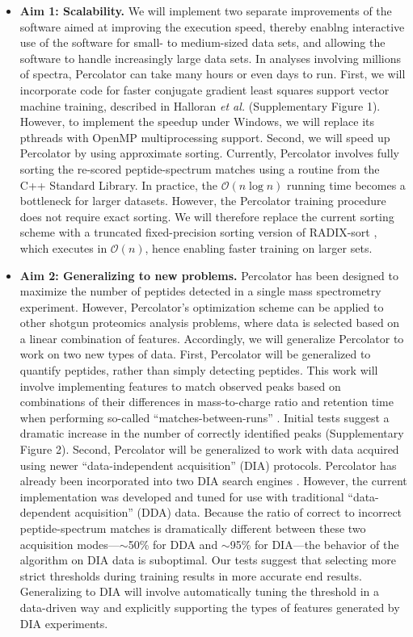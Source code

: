 \documentclass{article}
\begin{document}
\begin{itemize}

\item {\bf Aim 1: Scalability.}  We will implement two separate improvements of the software aimed at improving the execution speed, thereby enablng interactive use of the software for small- to medium-sized data sets, and allowing the software to handle increasingly large data sets. In analyses involving millions of spectra, Percolator can take many hours or even days to run.
First, we will incorporate code for faster conjugate gradient least squares support vector machine training, described in Halloran {\em et al.} \cite{halloran:matter} (Supplementary Figure 1). However, to implement the speedup under Windows, we will replace its pthreads with OpenMP multiprocessing support.  Second, we will speed up Percolator by using approximate sorting. Currently, Percolator involves fully sorting the re-scored peptide-spectrum matches using a routine from the C++ Standard Library. In practice, the $\mathcal{O}(n \log n)$ running time becomes a bottleneck for larger datasets. However, the Percolator training procedure does not require exact sorting. We will therefore replace the current sorting scheme with a truncated fixed-precision sorting version of RADIX-sort \cite{cormen:introduction}, which executes in $\mathcal{O}(n)$, hence enabling faster training on larger sets.

\item {\bf Aim 2: Generalizing to new problems.} Percolator has been designed to maximize the number of peptides detected in a single mass spectrometry experiment. However, Percolator's optimization scheme can be applied to other shotgun proteomics analysis problems, where data is selected based on a linear combination of features. Accordingly, we will generalize Percolator to work on two new types of data.  First, Percolator will be generalized to quantify peptides, rather than simply detecting peptides. This work will involve implementing features to match observed peaks based on combinations of their differences in mass-to-charge ratio and retention time when performing so-called ``matches-between-runs''  \cite{zhang:covariation}. Initial tests suggest a dramatic increase in the number of correctly identified peaks \cite{the:focus} (Supplementary Figure 2). Second, Percolator will be generalized to work with data acquired using newer ``data-independent acquisition'' (DIA) protocols.  Percolator has already been incorporated into two DIA search engines \cite{ting:pecan, searle:chromatogram}. However, the current implementation was developed and tuned for use with traditional ``data-dependent acquisition'' (DDA) data. Because the ratio of correct to incorrect peptide-spectrum matches is dramatically different between these two acquisition modes---$\sim$50\% for DDA and $\sim$95\% for DIA---the behavior of the algorithm on DIA data is suboptimal.  Our tests suggest that selecting more strict thresholds during training results in more accurate end results. Generalizing to DIA will involve automatically tuning the threshold in a data-driven way and explicitly supporting the types of features generated by DIA experiments.


\end{itemize}
\end{document}
